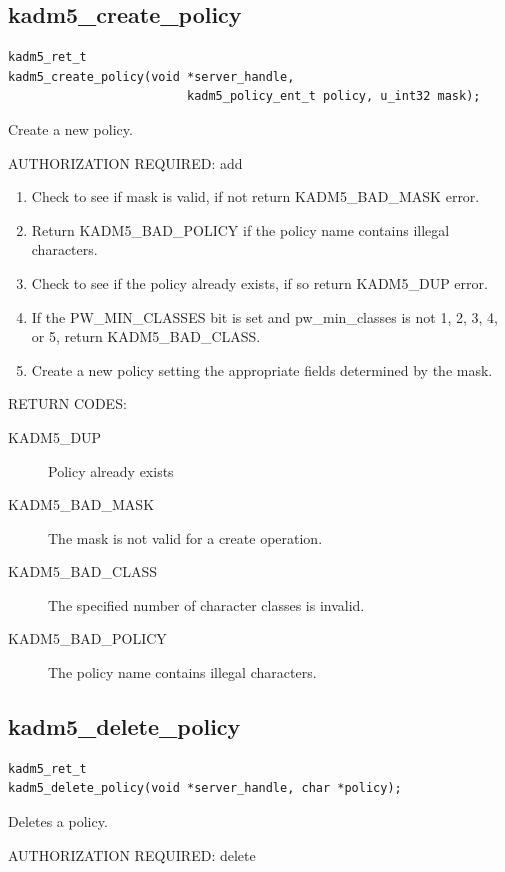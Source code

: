 \subsection{kadm5_create_policy}

\begin{verbatim}
kadm5_ret_t
kadm5_create_policy(void *server_handle,
                         kadm5_policy_ent_t policy, u_int32 mask);
\end{verbatim}

Create a new policy.

AUTHORIZATION REQUIRED: add

\begin{enumerate}
\item Check to see if mask is valid, if not return KADM5_BAD_MASK error.
\item Return KADM5_BAD_POLICY if the policy name contains illegal
characters.

\item Check to see if the policy already exists, if so return
KADM5_DUP error.
\item If the PW_MIN_CLASSES bit is set and pw_min_classes is not 1, 2,
3, 4, or 5, return KADM5_BAD_CLASS.
\item Create a new policy setting the appropriate fields determined
by the mask.
\end{enumerate}

RETURN CODES:

\begin{description}
\item[KADM5_DUP] Policy already exists
\item[KADM5_BAD_MASK] The mask is not valid for a create
operation.
\item[KADM5_BAD_CLASS] The specified number of character classes
is invalid.
\item[KADM5_BAD_POLICY] The policy name contains illegal characters.
\end{description}

\subsection{kadm5_delete_policy}

\begin{verbatim}
kadm5_ret_t
kadm5_delete_policy(void *server_handle, char *policy);
\end{verbatim}

Deletes a policy.

AUTHORIZATION REQUIRED: delete


